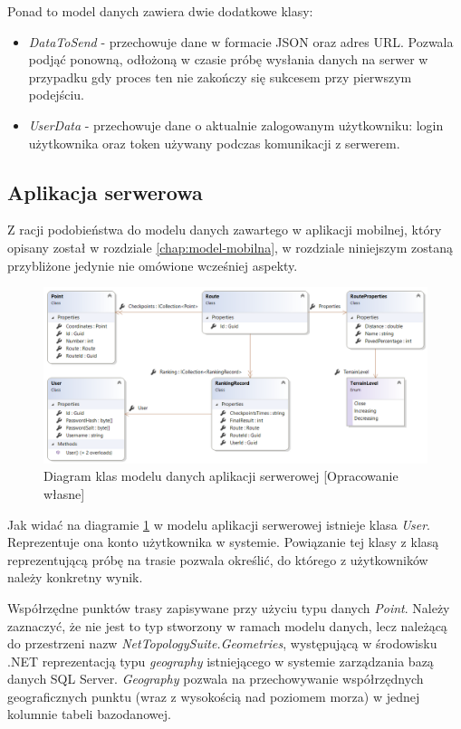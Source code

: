 Ponad to model danych zawiera dwie dodatkowe klasy:
\begin{itemize}
\item{\textit{DataToSend}} - przechowuje dane w formacie JSON oraz adres URL. Pozwala podjąć ponowną, odłożoną w czasie próbę wysłania danych na serwer w przypadku gdy proces ten nie zakończy się sukcesem przy pierwszym podejściu.
\item{\textit{UserData}} - przechowuje dane o aktualnie zalogowanym użytkowniku: login użytkownika oraz token używany podczas komunikacji z serwerem.
\end{itemize}
\subsection{Aplikacja serwerowa}
Z racji podobieństwa do modelu danych zawartego w aplikacji mobilnej, który opisany został w rozdziale \ref{chap:model-mobilna}, w rozdziale niniejszym zostaną przybliżone jedynie nie omówione wcześniej aspekty. 

\begin{figure}[h]\label{fig:api_model}
\begin{center}
\includegraphics[width=\textwidth]{img/api_model.png}
\caption{Diagram klas modelu danych aplikacji serwerowej [Opracowanie własne]}\label{image:api_model}
\end{center}
\end{figure}

Jak widać na diagramie \ref{image:api_model} w modelu aplikacji serwerowej istnieje klasa \textit{User}. Reprezentuje ona konto użytkownika w systemie. Powiązanie tej klasy z klasą reprezentującą próbę na trasie pozwala określić, do którego z użytkowników należy konkretny wynik.

Współrzędne punktów trasy zapisywane przy użyciu typu danych \textit{Point}. Należy zaznaczyć, że nie jest to typ stworzony w ramach modelu danych, lecz należącą do przestrzeni nazw \textit{NetTopologySuite.Geometries}, występującą w środowisku .NET reprezentacją typu \textit{geography} istniejącego w systemie zarządzania bazą danych SQL Server. \textit{Geography} pozwala na przechowywanie współrzędnych geograficznych punktu (wraz z wysokością nad poziomem morza) w jednej kolumnie tabeli bazodanowej. \cite{geography-type}

